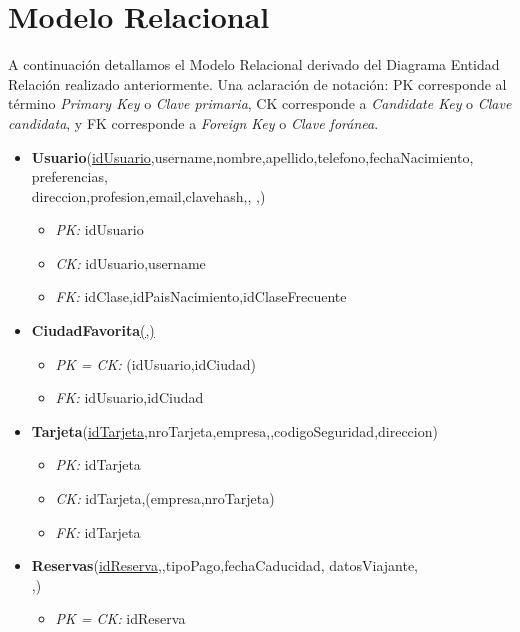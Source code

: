 \section{Modelo Relacional}

A continuaci\'on detallamos el Modelo Relacional derivado del
Diagrama Entidad Relaci\'on realizado anteriormente. Una aclaraci\'on
de notaci\'on: PK corresponde al t\'ermino \textit{Primary Key} o \textit{Clave primaria},
CK corresponde a \textit{Candidate Key} o \textit{Clave candidata}, y FK corresponde a
\textit{Foreign Key} o \textit{Clave for\'anea}.

\begin{itemize}
	\item \textbf{Usuario}(\underline{idUsuario},username,nombre,apellido,telefono,fechaNacimiento,
	preferencias,\\ direccion,profesion,email,clavehash,,
	,)
		\begin{itemize}
			\item \textit{PK:} idUsuario
			\item \textit{CK:} idUsuario,username
			\item \textit{FK:} idClase,idPaisNacimiento,idClaseFrecuente
		\end{itemize}
	\item \textbf{CiudadFavorita}\underline{(,)}
		\begin{itemize}
			\item \textit{PK = CK: } (idUsuario,idCiudad)
			\item \textit{FK:} idUsuario,idCiudad
		\end{itemize}
	\item \textbf{Tarjeta}(\underline{idTarjeta},nroTarjeta,empresa,,codigoSeguridad,direccion)
		\begin{itemize}
			\item \textit{PK:} idTarjeta
			\item \textit{CK:} idTarjeta,(empresa,nroTarjeta)
			\item \textit{FK:} idTarjeta
		\end{itemize}
	\item \textbf{Reservas}(\underline{idReserva},,tipoPago,fechaCaducidad, datosViajante,
		\\,)
		\begin{itemize}
			\item \textit{PK = CK:} idReserva

\end{itemize}
\end{itemize}
